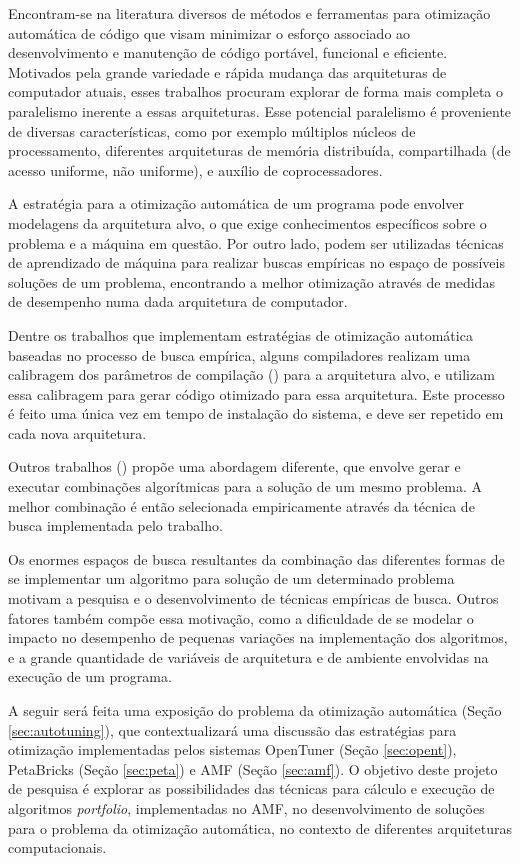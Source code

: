 \documentclass[a4paper, 11pt]{article}
\begin{document}
Encontram-se na literatura diversos de métodos e ferramentas para otimização 
automática de código que visam minimizar o esforço associado ao desenvolvimento
e manutenção de código portável, funcional e eficiente. Motivados pela grande
variedade e rápida mudança das arquiteturas de computador atuais, esses 
trabalhos procuram explorar de forma mais completa o paralelismo inerente a
essas arquiteturas. Esse potencial paralelismo é proveniente de diversas 
características, como por exemplo múltiplos núcleos de processamento, 
diferentes arquiteturas de memória distribuída, compartilhada (de acesso 
uniforme, não uniforme), e auxílio de coprocessadores.

A estratégia para a otimização automática de um programa pode envolver 
modelagens da arquitetura alvo, o que exige conhecimentos específicos sobre o 
problema e a máquina em questão. Por outro lado, podem ser utilizadas técnicas
de aprendizado de máquina para realizar buscas empíricas no espaço de possíveis
soluções de um problema, encontrando a melhor otimização através de medidas de 
desempenho numa dada arquitetura de computador.

Dentre os trabalhos que implementam estratégias de otimização automática 
baseadas no processo de busca empírica, alguns compiladores realizam uma 
calibragem dos parâmetros de compilação (\citet{bilmes1997,whaley1998}) para a
arquitetura alvo, e utilizam essa calibragem para gerar código otimizado para
essa arquitetura. Este processo é feito uma única vez em tempo de instalação
do sistema, e deve ser repetido em cada nova arquitetura.

Outros trabalhos (\citet{goldman2012framework,mitcsail-tr:2014,
vuduc2004}) propõe uma abordagem diferente, que envolve gerar e executar
combinações algorítmicas para a solução de um mesmo problema. A melhor
combinação é então selecionada empiricamente através da técnica de busca
implementada pelo trabalho.

Os enormes espaços de busca resultantes da combinação das diferentes formas de
se implementar um algoritmo para solução de um determinado problema motivam
a pesquisa e o desenvolvimento de técnicas empíricas de busca. Outros fatores 
também compõe essa motivação, como a dificuldade de se modelar o impacto no 
desempenho de pequenas variações na implementação dos algoritmos, e a grande 
quantidade de variáveis de arquitetura e de ambiente envolvidas na execução de 
um programa.

A seguir será feita uma exposição do problema da otimização automática 
(Seção \ref{sec:autotuning}), que contextualizará uma discussão das 
estratégias para otimização implementadas pelos sistemas 
OpenTuner (Seção \ref{sec:opent}), PetaBricks (Seção \ref{sec:peta}) e AMF
(Seção \ref{sec:amf}). O objetivo deste projeto de pesquisa é explorar as 
possibilidades das técnicas para cálculo e execução de algoritmos
\emph{portfolio}, implementadas no AMF, no desenvolvimento de soluções para o
problema da otimização automática, no contexto de diferentes arquiteturas 
computacionais.
\end{document}
